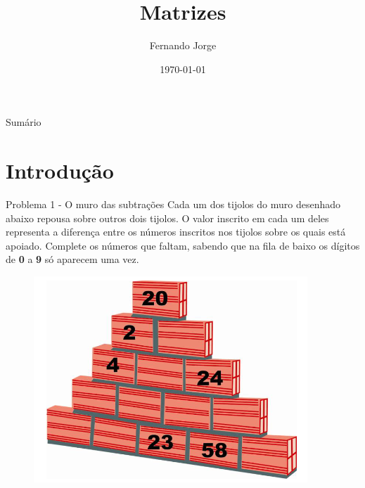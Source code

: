 \documentclass[aspectratio=169,xcolor=dvipsnames]{beamer}
\title[short title]{Matrizes} %
\author[Fernando-Jorge] {Fernando Jorge}
\institute[NTU] %
{
  Escola Estadual Professor Lima Castro
}
\date{\today} %
\begin{document}
\begin{frame}
    \titlepage
\end{frame}

\begin{frame}{Sumário}
    \tableofcontents
\end{frame}

\section{Introdução}

\begin{frame}{Problema 1 - O muro das subtrações}
    Cada um dos tijolos do muro desenhado abaixo repousa sobre outros dois tijolos.
    O valor inscrito em cada um deles representa a diferença entre os números
    inscritos nos tijolos sobre os quais está apoiado. Complete os números
    que faltam, sabendo que na fila de baixo os dígitos de \textbf{0} a \textbf{9}
    só aparecem uma vez.
  \begin{figure}[htb!]
    \centering
    \includegraphics[width=.4\linewidth]{images/muro.png}
  \end{figure}
\end{frame}

\end{document}
